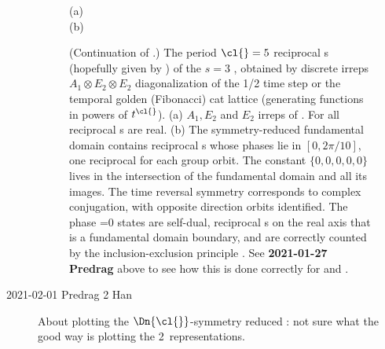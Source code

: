 \begin{description}

\begin{figure}
  \centering
{(a)} %
\\
{(b)} %
  \caption{\label{fig:HLcyclesD5}
(Continuation of .)
The  period $\cl{}=5$ reciprocal {\lattstate}s
(hopefully given by )
of the $s=3$ \templatt, obtained by discrete  irreps
$A_1\otimes{E_2}\otimes{E_2}$ diagonalization of the 1/2 time step
or the temporal golden (Fibonacci) cat lattice
(generating functions in powers of $t^\cl{}$).
    (a)
$A_1,{E_2}$ and ${E_2}$ irreps of .
For  all reciprocal {\lattstate}s are real.
    (b)
The   symmetry-reduced fundamental domain contains reciprocal
{\lattstate}s whose phases lie in $[0,2\pi/10]$, one reciprocal
{\lattstate} for each  group orbit.
The constant {\lattstate} $\{0,0,0,0,0\}$ lives in the
intersection of the fundamental domain and all its images.
The time reversal symmetry corresponds to complex conjugation, with
opposite direction orbits identified. The phase =0 states are self-dual,
reciprocal {\lattstate}s on the real axis that is
a fundamental domain boundary, and are correctly counted by the
inclusion-exclusion principle .
See {\bf 2021-01-27 Predrag} above to see how this is done correctly
for  and .
          }
\end{figure}

    \item[2021-02-01 Predrag 2 Han]
About plotting the $\Dn{\cl{}}$-symmetry reduced :
not sure what the good way is plotting the 2\dmn\ representations.


\end{description}

